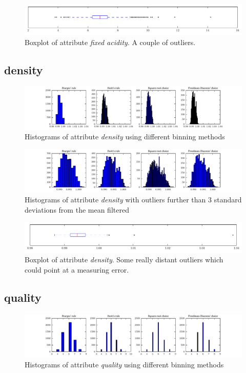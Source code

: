 \documentclass{report}
\begin{document}
\begin{figure}[H]
\includegraphics[width=\textwidth]{boxplots/fixed_acidity.pdf}
\caption{Boxplot of attribute \emph{fixed acidity}. A couple of outliers.}\end{figure}

\newpage
\subsection{density}
\begin{figure}[H]
\includegraphics[width=\textwidth]{histograms/density.pdf}
\caption{Histograms of attribute \emph{density} using different binning methods}\end{figure}

\begin{figure}[H]
\includegraphics[width=\textwidth]{histograms/density_filtered.pdf}
\caption{Histograms of attribute \emph{density} with outliers further than 3 standard deviations from the mean filtered}
\end{figure}

\begin{figure}[H]
\includegraphics[width=\textwidth]{boxplots/density.pdf}
\caption{Boxplot of attribute \emph{density}. Some really distant outliers which could point at a measuring error.}\end{figure}

\newpage
\subsection{quality}
\begin{figure}[H]
\includegraphics[width=\textwidth]{histograms/quality.pdf}
\caption{Histograms of attribute \emph{quality} using different binning methods}\end{figure}
\end{document}
